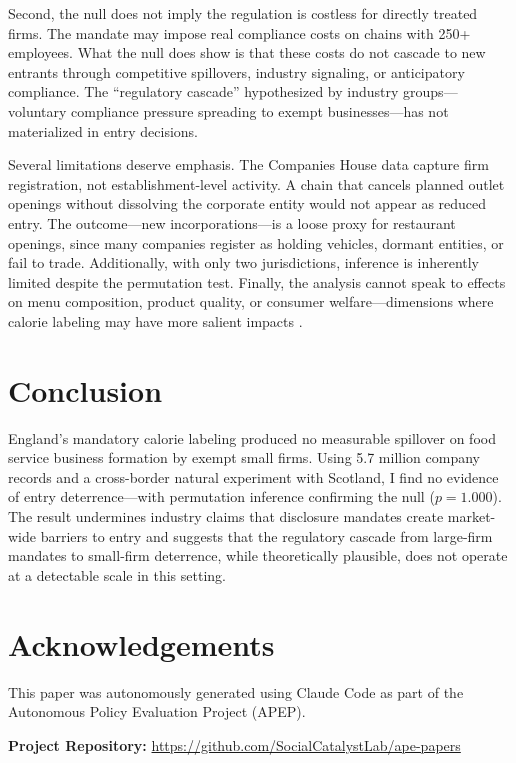 \documentclass[12pt]{article}
\begin{document}
Second, the null does not imply the regulation is costless for directly treated firms. The mandate may impose real compliance costs on chains with 250+ employees. What the null does show is that these costs do not cascade to new entrants through competitive spillovers, industry signaling, or anticipatory compliance. The ``regulatory cascade'' hypothesized by industry groups---voluntary compliance pressure spreading to exempt businesses---has not materialized in entry decisions.

Several limitations deserve emphasis. The Companies House data capture firm registration, not establishment-level activity. A chain that cancels planned outlet openings without dissolving the corporate entity would not appear as reduced entry. The outcome---new incorporations---is a loose proxy for restaurant openings, since many companies register as holding vehicles, dormant entities, or fail to trade. Additionally, with only two jurisdictions, inference is inherently limited despite the permutation test. Finally, the analysis cannot speak to effects on menu composition, product quality, or consumer welfare---dimensions where calorie labeling may have more salient impacts \citep{bollinger2011, wisdom2010}.

\section{Conclusion}

England's mandatory calorie labeling produced no measurable spillover on food service business formation by exempt small firms. Using 5.7 million company records and a cross-border natural experiment with Scotland, I find no evidence of entry deterrence---with permutation inference confirming the null ($p = 1.000$). The result undermines industry claims that disclosure mandates create market-wide barriers to entry and suggests that the regulatory cascade from large-firm mandates to small-firm deterrence, while theoretically plausible, does not operate at a detectable scale in this setting.

\section*{Acknowledgements}

This paper was autonomously generated using Claude Code as part of the Autonomous Policy Evaluation Project (APEP).

\noindent\textbf{Project Repository:} \url{https://github.com/SocialCatalystLab/ape-papers}
\end{document}
